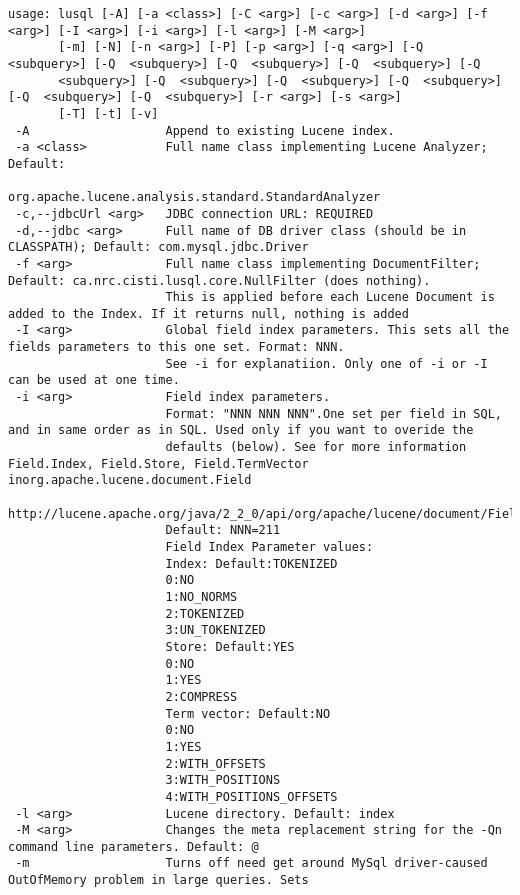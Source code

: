 
\begin{verbatim}
usage: lusql [-A] [-a <class>] [-C <arg>] [-c <arg>] [-d <arg>] [-f <arg>] [-I <arg>] [-i <arg>] [-l <arg>] [-M <arg>]
       [-m] [-N] [-n <arg>] [-P] [-p <arg>] [-q <arg>] [-Q  <subquery>] [-Q  <subquery>] [-Q  <subquery>] [-Q  <subquery>] [-Q 
       <subquery>] [-Q  <subquery>] [-Q  <subquery>] [-Q  <subquery>] [-Q  <subquery>] [-Q  <subquery>] [-r <arg>] [-s <arg>]
       [-T] [-t] [-v]
 -A                   Append to existing Lucene index.
 -a <class>           Full name class implementing Lucene Analyzer; Default:
                      org.apache.lucene.analysis.standard.StandardAnalyzer
 -c,--jdbcUrl <arg>   JDBC connection URL: REQUIRED
 -d,--jdbc <arg>      Full name of DB driver class (should be in CLASSPATH); Default: com.mysql.jdbc.Driver
 -f <arg>             Full name class implementing DocumentFilter; Default: ca.nrc.cisti.lusql.core.NullFilter (does nothing).
                      This is applied before each Lucene Document is added to the Index. If it returns null, nothing is added
 -I <arg>             Global field index parameters. This sets all the fields parameters to this one set. Format: NNN.
                      See -i for explanatiion. Only one of -i or -I can be used at one time.
 -i <arg>             Field index parameters.
                      Format: "NNN NNN NNN".One set per field in SQL, and in same order as in SQL. Used only if you want to overide the
                      defaults (below). See for more information Field.Index, Field.Store, Field.TermVector inorg.apache.lucene.document.Field
                      http://lucene.apache.org/java/2_2_0/api/org/apache/lucene/document/Field.html
                      Default: NNN=211
                      Field Index Parameter values:
                      Index: Default:TOKENIZED
                      0:NO
                      1:NO_NORMS
                      2:TOKENIZED
                      3:UN_TOKENIZED
                      Store: Default:YES
                      0:NO
                      1:YES
                      2:COMPRESS
                      Term vector: Default:NO
                      0:NO
                      1:YES
                      2:WITH_OFFSETS
                      3:WITH_POSITIONS
                      4:WITH_POSITIONS_OFFSETS
 -l <arg>             Lucene directory. Default: index
 -M <arg>             Changes the meta replacement string for the -Qn command line parameters. Default: @
 -m                   Turns off need get around MySql driver-caused OutOfMemory problem in large queries. Sets

\end{verbatim}
